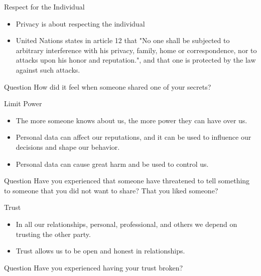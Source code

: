\documentclass{beamer}
\begin{document}
\begin{frame}{Respect for the Individual}
\begin{itemize}
  \item Privacy is about respecting the individual
  \item United Nations states in article 12 that "No one shall be subjected to arbitrary interference with his privacy, family, home or correspondence, nor to attacks upon his honor and reputation.", and that one is protected by the law against such attacks.
\end{itemize}
\begin{block}{Question}
How did it feel when someone shared one of your secrets?
\end{block}
\end{frame}


\begin{frame}{Limit Power}
\begin{itemize}
  \item The more someone knows about us, the more power they can have over us.
  \item Personal data can affect our reputations, and it can be used to influence our decisions and shape our behavior.
  \item Personal data can cause great harm and be used to control us.
\end{itemize}
\begin{block}{Question}
Have you experienced that someone have threatened to tell something to someone that you did not want to share? That you liked someone?
\end{block}
\end{frame}



\begin{frame}{Trust}
\begin{itemize}
  \item In all our relationships, personal, professional, and others we depend on trusting the other party.
  \item Trust allows us to be open and honest in relationships.
\end{itemize}
\begin{block}{Question}
Have you experienced having your trust broken?
\end{block}
\end{frame}
\end{document}
